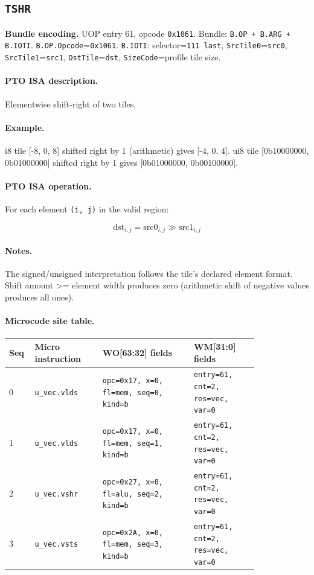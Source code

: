 \subsection{\texttt{TSHR}}
\noindent\textbf{Bundle encoding.} UOP entry 61, opcode \texttt{0x1061}. Bundle: \texttt{B.OP + B.ARG + B.IOTI}. \texttt{B.OP.Opcode}=\texttt{0x1061}. \texttt{B.IOTI}: selector=\texttt{111 last}, \texttt{SrcTile0}=\texttt{src0}, \texttt{SrcTile1}=\texttt{src1}, \texttt{DstTile}=\texttt{dst}, \texttt{SizeCode}=profile tile size.\par\smallskip
{\small
\paragraph{PTO ISA description.}
Elementwise shift-right of two tiles.
\paragraph{Example.}
i8 tile [-8, 0, 8] shifted right by 1 (arithmetic) gives [-4, 0, 4]. ui8 tile [0b10000000, 0b01000000] shifted right by 1 gives [0b01000000, 0b00100000].
\par\smallskip
\paragraph{PTO ISA operation.}
For each element \texttt{(i, j)} in the valid region:

\[
\mathrm{dst}_{i,j} = \mathrm{src0}_{i,j} \gg \mathrm{src1}_{i,j}
\]
}\par\smallskip
\paragraph{Notes.}
The signed/unsigned interpretation follows the tile's declared element format. Shift amount >= element width produces zero (arithmetic shift of negative values produces all ones).
\paragraph{Microcode site table.}
{\scriptsize
\begin{longtable}{@{}R{0.055\linewidth}L{0.23\linewidth}L{0.31\linewidth}L{0.22\linewidth}@{}}
\toprule
Seq & Micro instruction & WO[63:32] fields & WM[31:0] fields \\
 & \texttt{u\_vec.vlds} & \texttt{opc=0x17, x=0, fl=mem, seq=0, kind=b} & \texttt{entry=61, cnt=2, res=vec, var=0} \\
1 & \texttt{u\_vec.vlds} & \texttt{opc=0x17, x=0, fl=mem, seq=1, kind=b} & \texttt{entry=61, cnt=2, res=vec, var=0} \\
2 & \texttt{u\_vec.vshr} & \texttt{opc=0x27, x=0, fl=alu, seq=2, kind=b} & \texttt{entry=61, cnt=2, res=vec, var=0} \\
3 & \texttt{u\_vec.vsts} & \texttt{opc=0x2A, x=0, fl=mem, seq=3, kind=b} & \texttt{entry=61, cnt=2, res=vec, var=0} \\
\bottomrule
\end{longtable}
}
